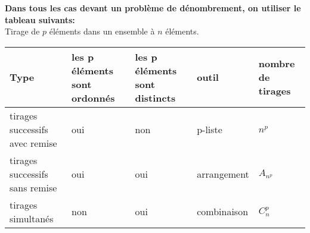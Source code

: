  \textbf{Dans tous les cas devant un problème de dénombrement, on utiliser le tableau suivants:}\\
 Tirage de $p$ éléments dans un ensemble à $n$ éléments.
 \begin{center}
 \setlength\arrayrulewidth{1.2pt}
 \begin{tabularx}{\textwidth}{|X|X|X|X|X|}
\hline
Type & les p éléments sont ordonnés&  les p éléments sont distincts& outil&nombre de tirages\\
\hline
tirages successifs avec remise  &   oui  & non &p-liste & $ n^{p} $ \\
\hline
tirages successifs sans remise  &  oui&   oui &  arrangement& $ A_{n^{p}} $\\
\hline
tirages simultanés \par & non  & oui &combinaison& $C_{n}^{p}$\\
\hline
\end{tabularx}
\end{center}

